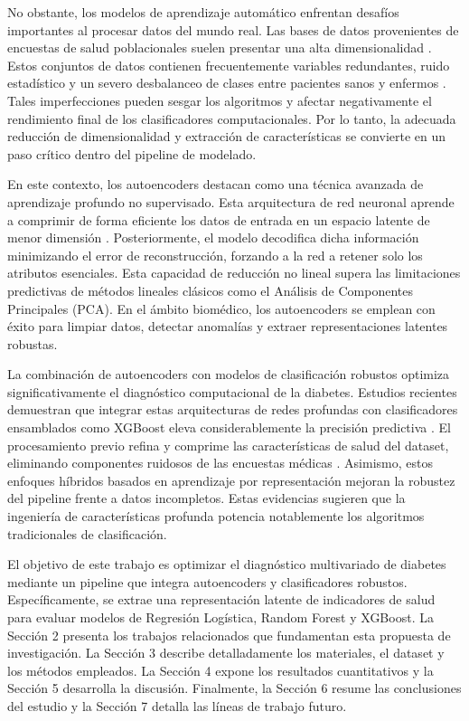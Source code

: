 \documentclass[journal]{IEEEtran}
\begin{document}
No obstante, los modelos de aprendizaje automático enfrentan desafíos importantes al procesar datos del mundo real. Las bases de datos provenientes de encuestas de salud poblacionales suelen presentar una alta dimensionalidad \cite{Islam2025b}. Estos conjuntos de datos contienen frecuentemente variables redundantes, ruido estadístico y un severo desbalanceo de clases entre pacientes sanos y enfermos \cite{Nisa2025, Elseddawy2022}. Tales imperfecciones pueden sesgar los algoritmos y afectar negativamente el rendimiento final de los clasificadores computacionales. Por lo tanto, la adecuada reducción de dimensionalidad y extracción de características se convierte en un paso crítico dentro del pipeline de modelado.

En este contexto, los autoencoders destacan como una técnica avanzada de aprendizaje profundo no supervisado. Esta arquitectura de red neuronal aprende a comprimir de forma eficiente los datos de entrada en un espacio latente de menor dimensión \cite{Islam2025a}. Posteriormente, el modelo decodifica dicha información minimizando el error de reconstrucción, forzando a la red a retener solo los atributos esenciales. Esta capacidad de reducción no lineal supera las limitaciones predictivas de métodos lineales clásicos como el Análisis de Componentes Principales (PCA). En el ámbito biomédico, los autoencoders se emplean con éxito para limpiar datos, detectar anomalías y extraer representaciones latentes robustas.

La combinación de autoencoders con modelos de clasificación robustos optimiza significativamente el diagnóstico computacional de la diabetes. Estudios recientes demuestran que integrar estas arquitecturas de redes profundas con clasificadores ensamblados como XGBoost eleva considerablemente la precisión predictiva \cite{Li2024}. El procesamiento previo refina y comprime las características de salud del dataset, eliminando componentes ruidosos de las encuestas médicas \cite{Islam2025b}. Asimismo, estos enfoques híbridos basados en aprendizaje por representación mejoran la robustez del pipeline frente a datos incompletos. Estas evidencias sugieren que la ingeniería de características profunda potencia notablemente los algoritmos tradicionales de clasificación.

El objetivo de este trabajo es optimizar el diagnóstico multivariado de diabetes mediante un pipeline que integra autoencoders y clasificadores robustos. Específicamente, se extrae una representación latente de indicadores de salud para evaluar modelos de Regresión Logística, Random Forest y XGBoost. La Sección 2 presenta los trabajos relacionados que fundamentan esta propuesta de investigación. La Sección 3 describe detalladamente los materiales, el dataset y los métodos empleados. La Sección 4 expone los resultados cuantitativos y la Sección 5 desarrolla la discusión. Finalmente, la Sección 6 resume las conclusiones del estudio y la Sección 7 detalla las líneas de trabajo futuro.
\end{document}

